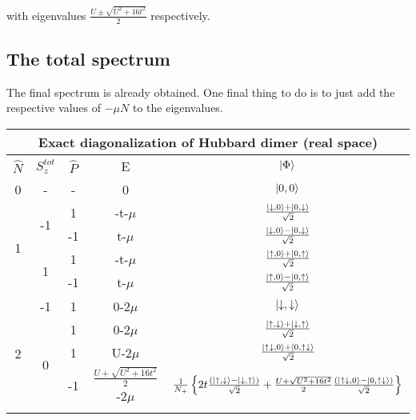 \documentclass[12pt]{article}
\begin{document}
with eigenvalues \(\frac{U\pm\sqrt{U^2+16 t^2}}{2}\) respectively.
\subsection{The total spectrum}
The final spectrum is already obtained. One final thing to do is to just add the respective values of \(-\mu N\) to the eigenvalues.
\begin{center}
\begin{tabular}{@{}ccccc@{}}
\toprule
	\multicolumn{5}{c}{\bf{Exact diagonalization of Hubbard dimer (real space)}} \\
\toprule
\(\hat{N}\) & \(S_z^{tot}\) & \(\hat{P}\) & E & \(\ket{\Phi}\)\\
\toprule
0 & - & - & 0 & \(\ket{0,0}\) \\ \toprule
\multicolumn{1}{c}{\multirow{4}{*}{1}} & \multirow{2}{*}{-1} & 1  & -t-\(\mu\)  & \(\frac{\ket{\downarrow,0}+\ket{0,\downarrow}}{\sqrt{2}}\)  \\ \cmidrule(l){3-5} 
\multicolumn{1}{c}{}                   &                     & -1 & t-\(\mu\)   & \(\frac{\ket{\downarrow,0}-\ket{0,\downarrow}}{\sqrt{2}}\)  \\ \cmidrule(l){2-5}
\multicolumn{1}{c}{}                   & \multirow{2}{*}{1}  & 1  & -t-\(\mu\)  & \(\frac{\ket{\uparrow,0}+\ket{0,\uparrow}}{\sqrt{2}}\)  \\ \cmidrule(l){3-5} 
\multicolumn{1}{c}{}                   &                     & -1 & t-\(\mu\)   & \(\frac{\ket{\uparrow,0}-\ket{0,\uparrow}}{\sqrt{2}}\)  \\ \toprule
\multirow{6}{*}{2}                     & -1                  & 1  & 0-\(2\mu\)   & \(\ket{\downarrow,\downarrow}\)  \\ \cmidrule(l){2-5} 
                                       & \multirow{4}{*}{0}  & 1  & 0-\(2\mu\)   & \(\frac{\ket{\uparrow,\downarrow}+\ket{\downarrow,\uparrow}}{\sqrt{2}}\)  \\ \cmidrule(l){3-5} 
                                       &                     & 1  & U-\(2\mu\)   & \(\frac{\ket{\uparrow\downarrow,0}+\ket{0,\uparrow\downarrow}}{\sqrt{2}}\)  \\ \cmidrule(l){3-5} 
                                       &                     & -1 & \(\frac{U+\sqrt{U^2+16 t^2}}{2}\)-\(2\mu\)    & \(\frac{1}{N_+}\left\{{2t \frac{(\ket{\uparrow,\downarrow}-\ket{\downarrow,\uparrow})}{\sqrt{2}} + \frac{U+\sqrt{U^2+16 t^2}}{2} \frac{(\ket{\uparrow\downarrow,0}-\ket{0,\uparrow\downarrow})}{\sqrt{2}}}\right\}\)  \\ \cmidrule(l){3-5} 

\end{tabular}
\end{center}
\end{document}
